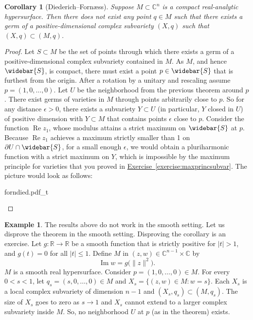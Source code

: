 \documentclass[12pt,openany]{book}
\renewcommand{\Re}{\operatorname{Re}}
\renewcommand{\Im}{\operatorname{Im}}
\newcommand{\sabs}[1]{\lvert {#1} \rvert}
\newcommand{\snorm}[1]{\lVert {#1} \rVert}
\newcommand{\C}{{\mathbb{C}}}
\newcommand{\R}{{\mathbb{R}}}
\theoremstyle{plain}
\newtheorem{cor}[thm]{Corollary}
\theoremstyle{remark}
\theoremstyle{definition}
\newenvironment{myfig}{%
    \begin{center}
}{%
    \end{center}
}
\theoremstyle{exercise}
\theoremstyle{example}
\newtheorem{example}[thm]{Example}
\newcommand{\exerciseref}[1]{\hyperref[#1]{Exercise~\ref*{#1}}}
\begin{document}
\begin{cor}[Diederich--Forn\ae ss]
Suppose $M \subset \C^n$ is a compact real-analytic hypersurface.
Then there does not exist any point $q \in M$ such that
there exists a germ of a positive-dimensional complex subvariety
$(X,q)$ such that $(X,q) \subset (M,q)$.
\end{cor}

\begin{proof}
Let $S \subset M$ be the set of points through which there exists 
a germ of a positive-dimensional complex subvariety contained in $M$.
As $M$, and hence $\widebar{S}$, is compact,
there must exist a point $p \in \widebar{S}$
that is furthest from
the origin.  After a rotation by a unitary and rescaling assume
$p=(1,0,\ldots,0)$.  Let $U$ be the neighborhood from the previous
theorem around $p$.  There exist germs of varieties in $M$ through points
arbitrarily close to $p$.  So for any distance $\epsilon > 0$,
there exists a subvariety $Y \subset U$ (in particular, $Y$ closed in $U$)
of positive dimension with $Y \subset M$ that contains points 
$\epsilon$ close to $p$.  Consider the function $\Re z_1$, whose modulus attains a
strict maximum on $\widebar{S}$ at $p$.  Because $\Re z_1$ achieves a maximum
strictly smaller than 1 on $\partial U \cap \widebar{S}$, for a small enough $\epsilon$,
we would obtain a pluriharmonic function with a strict
maximum on $Y$, which is impossible by the maximum principle for
varieties that you proved in \exerciseref{exercise:maxprincsubvar}.
The picture would look as follows:
\begin{myfig}
\medskip
{forndied.pdf_t}
\end{myfig}
\end{proof}

\begin{example}
The results above do not work
in the smooth setting.  Let us disprove the theorem in the smooth
setting.  Disproving the corollary is an exercise.
Let $g \colon \R \to \R$ be a smooth function that is
strictly positive for $\sabs{t} > 1$, and $g(t) = 0$ for all $\sabs{t} \leq 1$.
Define $M$ in $(z,w) \in \C^{n-1} \times \C$ by
\begin{equation*}
\Im w = g\bigl(\snorm{z}^2\bigr) .
\end{equation*}
$M$ is a smooth real hypersurface.
Consider $p = (1,0,\ldots,0) \in M$.  For every $0 < s < 1$, let
$q_s = (s,0,\ldots,0) \in M$ and $X_s = \bigl\{ (z,w) \in M :
w = s \bigr\}$.  Each $X_s$ is a local complex subvariety of dimension $n-1$
and $(X_s,q_s) \subset (M,q_s)$.  The size of $X_s$ goes to
zero as $s \to 1$ and $X_s$ cannot extend to a
larger complex subvariety inside $M$.  So, no neighborhood $U$ at
$p$ (as in the theorem) exists.
\end{example}
\end{document}
